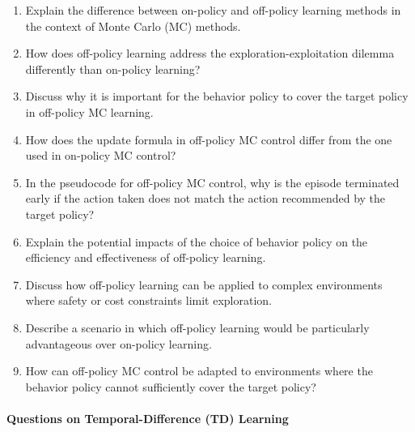 \begin{enumerate}
\item Explain the difference between on-policy and off-policy learning methods in the context of Monte Carlo (MC) methods.
\item How does off-policy learning address the exploration-exploitation dilemma differently than on-policy learning?
\item Discuss why it is important for the behavior policy to cover the target policy in off-policy MC learning.
\item How does the update formula in off-policy MC control differ from the one used in on-policy MC control?
\item In the pseudocode for off-policy MC control, why is the episode terminated early if the action taken does not match the action recommended by the target policy?
\item Explain the potential impacts of the choice of behavior policy on the efficiency and effectiveness of off-policy learning.
\item Discuss how off-policy learning can be applied to complex environments where safety or cost constraints limit exploration.
\item Describe a scenario in which off-policy learning would be particularly advantageous over on-policy learning.
\item How can off-policy MC control be adapted to environments where the behavior policy cannot sufficiently cover the target policy?
\end{enumerate}

\paragraph*{Questions on Temporal-Difference (TD) Learning}

